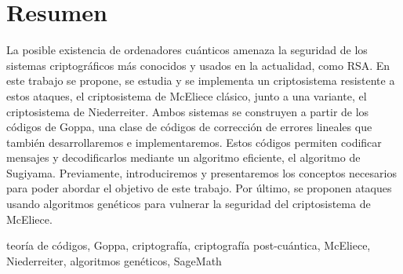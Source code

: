 \newpage
\null
\thispagestyle{empty}

\chapter*{Resumen}

La posible existencia de ordenadores cuánticos amenaza la seguridad de los sistemas criptográficos más conocidos y usados en la actualidad, como RSA. En este trabajo se propone, se estudia y se implementa un criptosistema resistente a estos ataques, el criptosistema de McEliece clásico, junto a una variante, el criptosistema de Niederreiter. Ambos sistemas se construyen a partir de los códigos de Goppa, una clase de códigos de corrección de errores lineales que también desarrollaremos e implementaremos. Estos códigos permiten codificar mensajes y decodificarlos mediante un algoritmo eficiente, el algoritmo de Sugiyama. Previamente, introduciremos y presentaremos los conceptos necesarios para poder abordar el objetivo de este trabajo. Por último, se proponen ataques usando algoritmos genéticos para vulnerar la seguridad del criptosistema de McEliece.

\small{ teoría de códigos, \; Goppa, \; criptografía, \; criptografía post-cuántica, \; McEliece, \; Niederreiter, \; algoritmos genéticos, \; SageMath}

\newpage